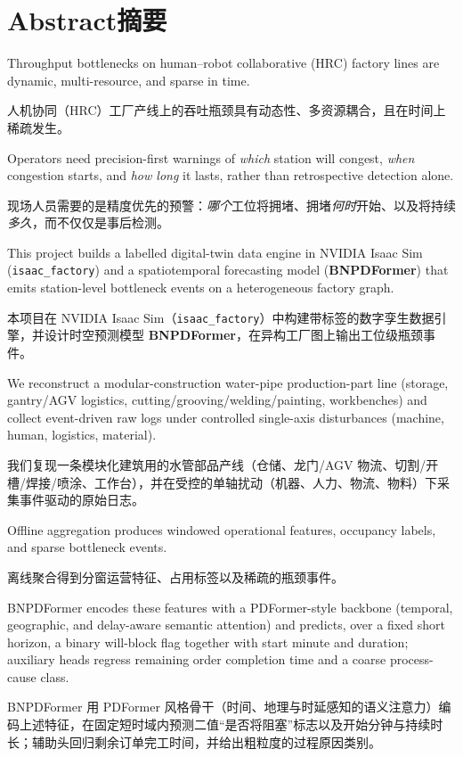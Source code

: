 \documentclass[12pt,a4paper,oneside,scheme=plain]{ctexrep}
\newcommand{\bip}[2]{%
  \par #1\par
  \nobreak\vspace{0.12em}%
  {\small\color{black!62}#2}\par
  \vspace{0.62em}%
}
\begin{document}
\tableofcontents
\clearpage

\chapter*{Abstract\quad 摘要}

\bip
{Throughput bottlenecks on human--robot collaborative (HRC) factory lines are dynamic, multi-resource, and sparse in time.}
{人机协同（HRC）工厂产线上的吞吐瓶颈具有动态性、多资源耦合，且在时间上稀疏发生。}

\bip
{Operators need precision-first warnings of \emph{which} station will congest, \emph{when} congestion starts, and \emph{how long} it lasts, rather than retrospective detection alone.}
{现场人员需要的是精度优先的预警：\emph{哪个}工位将拥堵、拥堵\emph{何时}开始、以及将持续\emph{多久}，而不仅仅是事后检测。}

\bip
{This project builds a labelled digital-twin data engine in NVIDIA Isaac Sim (\texttt{isaac\_factory}) and a spatiotemporal forecasting model (\textbf{BNPDFormer}) that emits station-level bottleneck events on a heterogeneous factory graph.}
{本项目在 NVIDIA Isaac Sim（\texttt{isaac\_factory}）中构建带标签的数字孪生数据引擎，并设计时空预测模型 \textbf{BNPDFormer}，在异构工厂图上输出工位级瓶颈事件。}

\bip
{We reconstruct a modular-construction water-pipe production-part line (storage, gantry/AGV logistics, cutting/grooving/welding/painting, workbenches) and collect event-driven raw logs under controlled single-axis disturbances (machine, human, logistics, material).}
{我们复现一条模块化建筑用的水管部品产线（仓储、龙门/AGV 物流、切割/开槽/焊接/喷涂、工作台），并在受控的单轴扰动（机器、人力、物流、物料）下采集事件驱动的原始日志。}

\bip
{Offline aggregation produces windowed operational features, occupancy labels, and sparse bottleneck events.}
{离线聚合得到分窗运营特征、占用标签以及稀疏的瓶颈事件。}

\bip
{BNPDFormer encodes these features with a PDFormer-style backbone (temporal, geographic, and delay-aware semantic attention) and predicts, over a fixed short horizon, a binary will-block flag together with start minute and duration; auxiliary heads regress remaining order completion time and a coarse process-cause class.}
{BNPDFormer 用 PDFormer 风格骨干（时间、地理与时延感知的语义注意力）编码上述特征，在固定短时域内预测二值“是否将阻塞”标志以及开始分钟与持续时长；辅助头回归剩余订单完工时间，并给出粗粒度的过程原因类别。}
\end{document}
